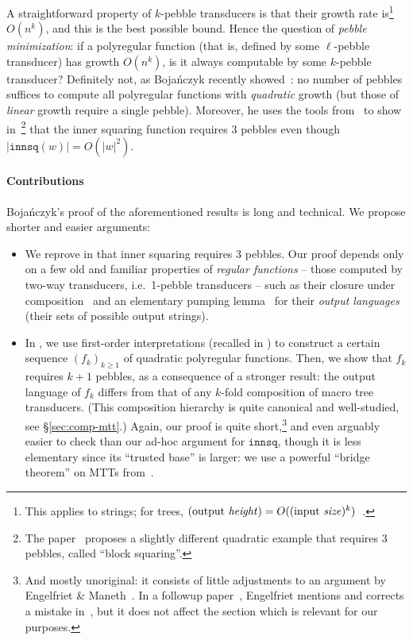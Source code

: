 \documentclass{fundam}
\theoremstyle{claimstyle}
\newcommand\innsq{\mathtt{innsq}}
\begin{document}
A straightforward property of $k$-pebble transducers is that their growth rate
is\footnote{This applies to strings; for trees, $(\text{output \emph{height}}) =
  O((\text{input \emph{size}})^k)$~\cite[Lemma~7]{EngelfrietPebbleMacro}.}
$O(n^k)$, and this is the best possible bound. Hence the question of
\emph{pebble minimization}: if a polyregular function (that is, defined by some
$\ell$-pebble transducer) has growth $O(n^k)$, is it always computable by some
$k$-pebble transducer? Definitely not, as Bojańczyk recently
showed~\cite[Section~3]{PolyregGrowth}: no number of pebbles suffices to compute
all polyregular functions with \emph{quadratic} growth (but those of
\emph{linear} growth require a single pebble). Moreover, he uses the tools
from~\cite{PolyregGrowth} to show
in~\cite[Theorem~6.3]{PolyregSurvey}\footnote{The paper~\cite{PolyregGrowth}
  proposes a slightly different quadratic example that requires 3 pebbles,
  called \enquote{block squaring}.} that the inner squaring function requires 3
pebbles even though $|\innsq(w)| = O(|w|^2)$.

\paragraph{Contributions}

Bojańczyk's proof of the aforementioned results is long and technical. We
propose shorter and easier arguments:
\begin{itemize}
\item We reprove in  that inner squaring requires 3 pebbles.
  Our proof depends only on a few old and familiar properties of \emph{regular
    functions} -- those computed by two-way transducers, i.e.\ \mbox{1-pebble}
  transducers -- such as their closure under composition~\cite{ChytilJ77} and an
  elementary pumping lemma~\cite{Rozoy} for their \emph{output languages} (their
  sets of possible output strings).
\item In , we use first-order interpretations
  (recalled in ) to construct a certain sequence
  $(f_k)_{k\geq1}$ of quadratic polyregular functions. Then, we show that $f_k$
  requires $k+1$ pebbles, as a consequence of a stronger result: the output
  language of $f_k$ differs from that of any $k$-fold composition of macro tree
  transducers. (This composition hierarchy is quite canonical and well-studied,
  see \S\ref{sec:comp-mtt}.) Again, our proof is quite short,\footnote{And
    mostly unoriginal: it consists of little adjustments to an argument by
    Engelfriet \& Maneth~\cite[\S4]{PebbleString}. In a followup
    paper~\cite{PebbleComposition}, Engelfriet mentions and corrects a mistake
    in~\cite[\S3]{PebbleString}, but it does not affect the section which is
    relevant for our purposes.} and even arguably easier to check than our
  ad-hoc argument for $\innsq$, though it is less elementary since its
  \enquote{trusted base} is larger: we use a powerful \enquote{bridge theorem}
  on MTTs from~\cite{OutputMacro}.
\end{itemize}
\end{document}
